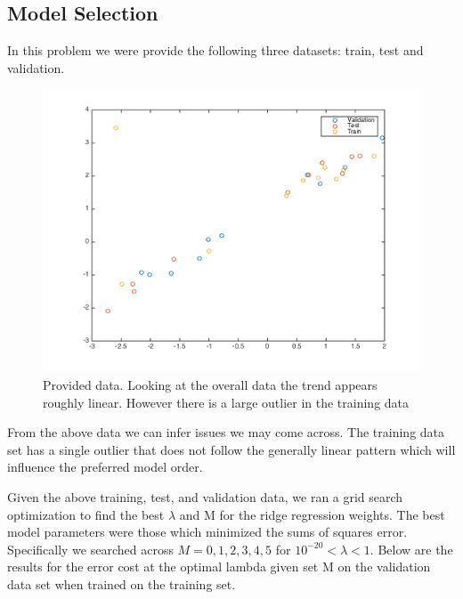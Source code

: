 \documentclass[10pt,twocolumn]{article}
\begin{document}
\subsection*{ Model Selection}
In this problem we were provide the following three datasets: train, test and validation. 
\begin{figure}[H]
\center
\includegraphics[scale =.4]{test_train_validate.png}
\caption{Provided data. Looking at the overall data the trend appears roughly linear. However there is a large outlier in the training data}
\end{figure}

From the above data we can infer issues we may come across. The training data set has a single outlier that does not follow the generally linear pattern which will influence the preferred model order. 

Given the above training, test, and validation data, we ran a grid search optimization to find the best $\lambda$ and M for the ridge regression weights. The best model parameters were those which minimized the sums of squares error. Specifically we searched across $M= {0,1,2,3,4,5}$  for $10^{-20} < \lambda <1 $. Below are the results for the error cost at the optimal lambda given set M on the validation data set when trained on the training set. 
\end{document}
